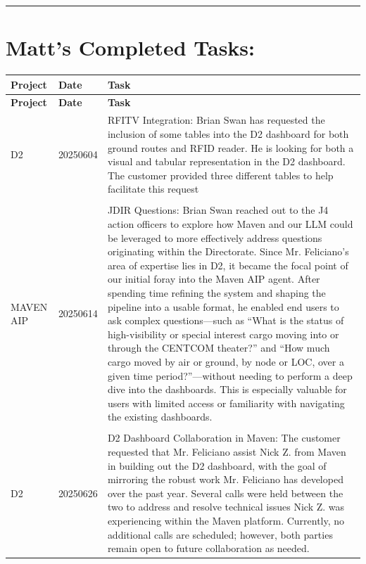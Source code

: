 \documentclass{article}
\begin{document}
\vspace{0.5cm}
\hrule
\vspace{1cm}


\section*{\centering \textbf{ Matt's Completed Tasks: }}
\label{sec:matt_tasks}


\begin{longtable}{@{}p{2.5cm} p{2.5cm} p{9cm}@{}}
\toprule
\textbf{ Project } & \textbf{ Date } & \textbf{ Task } \\
\midrule
\endfirsthead

\toprule
\textbf{ Project } & \textbf{ Date } & \textbf{ Task } \\
\midrule
\endhead

\bottomrule
\endfoot


D2 & 20250604 & RFITV Integration: Brian Swan has requested the inclusion of some tables into the D2 dashboard for both ground routes and RFID reader. He is looking for both a visual and tabular representation in the D2 dashboard. The customer provided three different tables to help facilitate this request \\

\\[-0.5ex]  %


MAVEN AIP & 20250614 & JDIR Questions: Brian Swan reached out to the J4 action officers to explore how Maven and our LLM could be leveraged to more effectively address questions originating within the Directorate. Since Mr. Feliciano’s area of expertise lies in D2, it became the focal point of our initial foray into the Maven AIP agent. After spending time refining the system and shaping the pipeline into a usable format, he enabled end users to ask complex questions—such as “What is the status of high-visibility or special interest cargo moving into or through the CENTCOM theater?” and “How much cargo moved by air or ground, by node or LOC, over a given time period?”—without needing to perform a deep dive into the dashboards. This is especially valuable for users with limited access or familiarity with navigating the existing dashboards. \\

\\[-0.5ex]  %


D2 & 20250626 & D2 Dashboard Collaboration in Maven: The customer requested that Mr. Feliciano assist Nick Z. from Maven in building out the D2 dashboard, with the goal of mirroring the robust work Mr. Feliciano has developed over the past year. Several calls were held between the two to address and resolve technical issues Nick Z. was experiencing within the Maven platform. Currently, no additional calls are scheduled; however, both parties remain open to future collaboration as needed. \\


\end{longtable}
\end{document}
